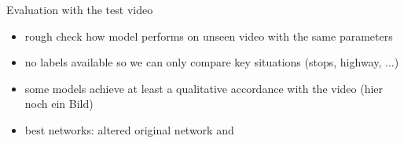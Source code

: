 \begin{frame}{Evaluation with the test video}
	\begin{itemize}
		\item rough check how model performs on unseen video with the same parameters
		\item no labels available so we can only compare key situations (stops, highway, ...)
		\item some models achieve at least a qualitative accordance with the video (hier noch ein Bild)
		\item best networks: altered original network and 
	\end{itemize}
\end{frame}